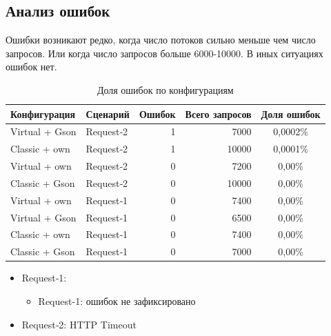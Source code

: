 \documentclass[areasetadvanced]{scrartcl}
\begin{document}
\subsection{Анализ ошибок}
Ошибки возникают редко, когда число потоков сильно меньше чем число запросов. Или когда число запросов больше 6000-10000. 
В иных ситуациях ошибок нет.
\begin{table}[H]
    \centering
    \caption{Доля ошибок по конфигурациям}
    \label{tab:error-rates}
    \begin{tabular}{@{}l l r r c@{}}
      \toprule
      Конфигурация    & Сценарий   & Ошибок & Всего запросов & Доля ошибок \\
      \midrule
      Virtual + Gson  & Request‑2  &      1 &           7000 & 0,0002\%      \\
      Classic + own   & Request‑2  &      1 &           10000 & 0,0001\%      \\
      Virtual + own   & Request‑2  &      0 &           7200 & 0,00\%      \\
      Classic + Gson  & Request‑2  &      0 &           10000 & 0,00\%      \\
      Virtual + own   & Request‑1  &      0 &           7400 & 0,00\%      \\
      Virtual + Gson  & Request‑1  &      0 &           6500 & 0,00\%      \\
      Classic + own   & Request‑1  &      0 &           7400 & 0,00\%      \\
      Classic + Gson  & Request‑1  &      0 &           7000 & 0,00\%      \\
      \bottomrule
    \end{tabular}
\end{table}
  
\begin{itemize}
  \item Request‑1:  
    \begin{itemize}
      \item Request-1: ошибок не зафиксировано 
    \end{itemize}
  \item Request‑2: HTTP Timeout 
\end{itemize}

\newpage
\end{document}
